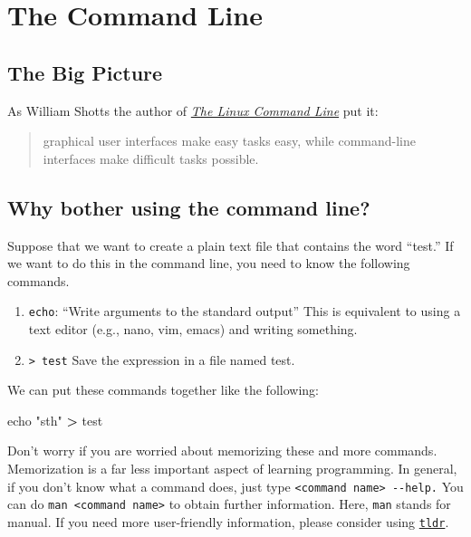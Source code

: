 \documentclass[
]{book}
\newenvironment{Shaded}{\begin{snugshade}}{\end{snugshade}}
\newcommand{\BuiltInTok}[1]{#1}
\newcommand{\NormalTok}[1]{#1}
\newcommand{\OperatorTok}[1]{\textcolor[rgb]{0.81,0.36,0.00}{\textbf{#1}}}
\newcommand{\StringTok}[1]{\textcolor[rgb]{0.31,0.60,0.02}{#1}}
\providecommand{\tightlist}{%
  \setlength{\itemsep}{0pt}\setlength{\parskip}{0pt}}
\begin{document}
\hypertarget{the-command-line}{%
\section{The Command Line}\label{the-command-line}}

\hypertarget{the-big-picture}{%
\subsection{The Big Picture}\label{the-big-picture}}

As William Shotts the author of \emph{\href{http://linuxcommand.org/tlcl.php}{The Linux Command Line}} put it:

\begin{quote}
graphical user interfaces make easy tasks easy, while command-line interfaces make difficult tasks possible.
\end{quote}

\hypertarget{why-bother-using-the-command-line}{%
\subsection{Why bother using the command line?}\label{why-bother-using-the-command-line}}

Suppose that we want to create a plain text file that contains the word ``test.'' If we want to do this in the command line, you need to know the following commands.

\begin{enumerate}
\def\labelenumi{\arabic{enumi}.}
\tightlist
\item
  \texttt{echo}: ``Write arguments to the standard output'' This is equivalent to using a text editor (e.g., nano, vim, emacs) and writing something.
\item
  \texttt{\textgreater{}\ test} Save the expression in a file named test.
\end{enumerate}

We can put these commands together like the following:

\begin{Shaded}
\begin{Highlighting}[]
\BuiltInTok{echo} \StringTok{"sth"} \OperatorTok{\textgreater{}}\NormalTok{ test }
\end{Highlighting}
\end{Shaded}

Don't worry if you are worried about memorizing these and more commands. Memorization is a far less important aspect of learning programming. In general, if you don't know what a command does, just type \texttt{\textless{}command\ name\textgreater{}\ -\/-help.} You can do \texttt{man\ \textless{}command\ name\textgreater{}} to obtain further information. Here, \texttt{man} stands for manual. If you need more user-friendly information, please consider using \href{https://tldr.sh/}{\texttt{tldr}}.
\end{document}
